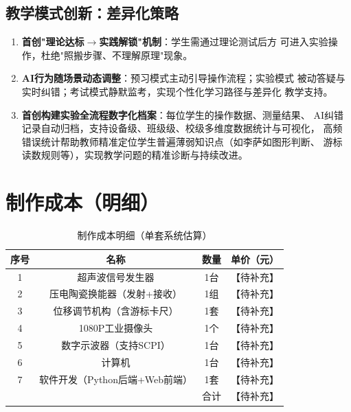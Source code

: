 \subsection{教学模式创新：差异化策略}

\begin{enumerate}
    \item \textbf{首创"理论达标$\to$实践解锁"机制}：学生需通过理论测试后方
          可进入实验操作，杜绝"照搬步骤、不理解原理"现象。

    \item \textbf{AI行为随场景动态调整}：预习模式主动引导操作流程；实验模式
          被动答疑与实时纠错；考试模式静默监考，实现个性化学习路径与差异化
          教学支持。

    \item \textbf{首创构建实验全流程数字化档案}：每位学生的操作数据、测量结果、
          AI纠错记录自动归档，支持设备级、班级级、校级多维度数据统计与可视化，
          高频错误统计帮助教师精准定位学生普遍薄弱知识点（如李萨如图形判断、
          游标读数规则等），实现教学问题的精准诊断与持续改进。
\end{enumerate}

\section{制作成本（明细）}

\begin{table}[h]
    \centering
    \caption{制作成本明细（单套系统估算）}
    \begin{tabular}{|c|c|c|c|}
        \hline
        序号 & 名称 & 数量 & 单价（元） \\
        \hline
        1 & 超声波信号发生器 & 1台 & 【待补充】 \\
        \hline
        2 & 压电陶瓷换能器（发射+接收） & 1组 & 【待补充】 \\
        \hline
        3 & 位移调节机构（含游标卡尺） & 1套 & 【待补充】 \\
        \hline
        4 & 1080P工业摄像头 & 1个 & 【待补充】 \\
        \hline
        5 & 数字示波器（支持SCPI） & 1台 & 【待补充】 \\
        \hline
        6 & 计算机 & 1台 & 【待补充】 \\
        \hline
        7 & 软件开发（Python后端+Web前端） & 1套 & 【待补充】 \\
        \hline
        \multicolumn{3}{|r|}{合计} & 【待补充】 \\
        \hline
    \end{tabular}
\end{table}


